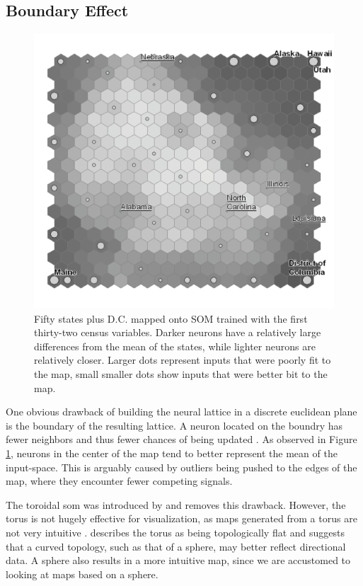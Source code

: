 \documentclass[11pt]{article}
\begin{document}
\subsection{Boundary Effect}
\begin{figure}
\centering
\includegraphics[width=1\linewidth]{gridedge_grey.pdf}
\caption{Fifty states plus D.C. mapped onto SOM trained with the first thirty-two census
variables.  Darker neurons have a relatively large differences from the mean of
the states, while lighter neurons are relatively closer.  Larger dots represent inputs
that were poorly fit to the map, small smaller dots show inputs that were better bit to the map.}
\label{figure1}
\end{figure}

One obvious drawback of building the neural lattice in a discrete euclidean 
plane is the boundary of the resulting lattice.  A neuron located on the boundry has 
fewer neighbors and thus fewer chances of being updated \citep{Wu:2006lr}.  
As observed in Figure \ref{figure1}, neurons in the center of the 
map tend to better represent the mean of the input-space.  This is arguably caused 
by outliers being pushed to the edges of the map, where they encounter fewer 
competing signals.

The toroidal som was introduced by \cite{li1993} and removes this drawback.
However, the torus is not hugely effective for visualization, as maps generated from 
a torus are not very intuitive \citep{ito2000,Wu:2006lr}.  \cite{ritter99} describes 
the torus as being topologically flat and suggests that a curved topology, such 
as that of a sphere, may better reflect directional data.  A sphere also results in a 
more intuitive map, since we are accustomed to looking at maps based on a sphere.
\end{document}
